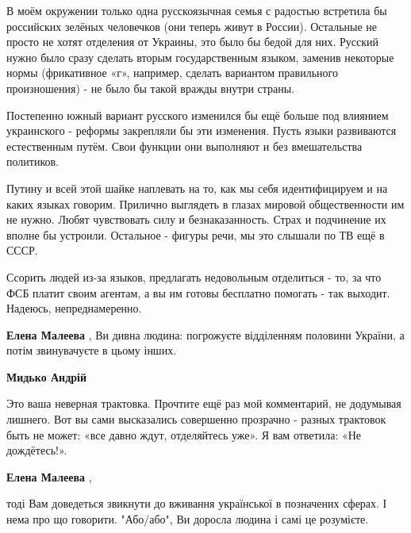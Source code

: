 \begin{itemize}
\begin{itemize}
В моём окружении только одна русскоязычная семья с радостью встретила бы
российских зелёных человечков (они теперь живут в России). Остальные не просто
не хотят отделения от Украины, это было бы бедой для них. Русский нужно было
сразу сделать вторым государственным языком, заменив некоторые нормы
(фрикативное «г», например, сделать вариантом правильного произношения) - не
было бы такой вражды внутри страны. 

Постепенно южный вариант русского изменился бы ещё больше под влиянием
украинского - реформы закрепляли бы эти изменения. Пусть языки развиваются
естественным путём. Свои функции они выполняют и без вмешательства политиков.

Путину и всей этой шайке наплевать на то, как мы себя идентифицируем и на каких
языках говорим. Прилично выглядеть в глазах мировой общественности им не нужно.
Любят чувствовать силу и безнаказанность. Страх и подчинение их вполне бы
устроили. Остальное - фигуры речи, мы это слышали по ТВ ещё в СССР.

Ссорить людей из-за языков, предлагать недовольным отделиться - то, за что ФСБ
платит своим агентам, а вы им готовы бесплатно помогать - так выходит. Надеюсь,
непреднамеренно.


\textbf{Елена Малеева} , Ви дивна людина: погрожуєте відділенням половини України, а потім звинувачуєте в цьому інших.

 
\textbf{Мидько Андрій} 

Это ваша неверная трактовка. Прочтите ещё раз мой комментарий, не додумывая
лишнего. Вот вы сами высказались совершенно прозрачно - разных трактовок быть
не может: «все давно ждут, отделяйтесь уже». Я вам ответила: «Не дождётесь!».


 
\textbf{Елена Малеева} , 

тоді Вам доведеться звикнути до вживання української в позначених сферах. І
нема про що говорити. "Або/або", Ви доросла людина і самі це розумієте.



\end{itemize}
\end{itemize}
